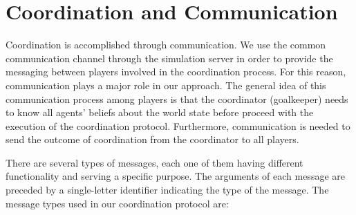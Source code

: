 \section{Coordination and Communication}
Coordination is accomplished through communication. We use the common communication channel through the simulation server in order to provide the messaging between players involved in the coordination process. For this reason, communication plays a major role in our approach. The general idea of this communication process among players is that the coordinator (goalkeeper) needs to know all agents' beliefs about the world state before proceed with the execution of the coordination protocol. Furthermore, communication is needed to send the outcome of coordination from the coordinator to all players. 

There are several types of messages, each one of them having different functionality and serving a specific purpose. The arguments of each message are preceded by a single-letter identifier indicating the type of the message. The message types used in our coordination protocol are:
